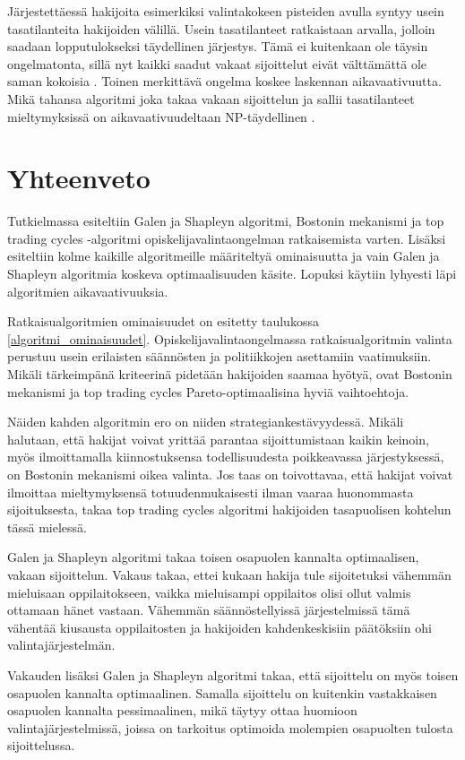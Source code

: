 \documentclass[twoside]{tktltiki}
\begin{document}
Järjestettäessä hakijoita esimerkiksi valintakokeen pisteiden avulla
syntyy usein tasatilanteita hakijoiden välillä. Usein tasatilanteet
ratkaistaan arvalla, jolloin saadaan lopputulokseksi täydellinen
järjestys. Tämä ei kuitenkaan ole täysin ongelmatonta, sillä nyt
kaikki saadut vakaat sijoittelut eivät välttämättä ole saman kokoisia
\cite{manlove02}. Toinen merkittävä ongelma koskee laskennan
aikavaativuutta. Mikä tahansa algoritmi joka takaa vakaan sijoittelun
ja sallii tasatilanteet mieltymyksissä on aikavaativuudeltaan
NP-täydellinen \cite{manlove02}.

\section{Yhteenveto}

Tutkielmassa esiteltiin Galen ja Shapleyn algoritmi, Bostonin
mekanismi ja top trading cycles -algoritmi opiskelijavalintaongelman
ratkaisemista varten. Lisäksi esiteltiin kolme kaikille algoritmeille
määriteltyä ominaisuutta ja vain Galen ja Shapleyn algoritmia koskeva
optimaalisuuden käsite. Lopuksi käytiin lyhyesti läpi algoritmien
aikavaativuuksia.

Ratkaisualgoritmien ominaisuudet on esitetty taulukossa
\ref{algoritmi_ominaisuudet}. Opiskelijavalintaongelmassa
ratkaisualgoritmin valinta perustuu usein erilaisten säännösten ja
politiikkojen asettamiin vaatimuksiin. Mikäli tärkeimpänä kriteerinä
pidetään hakijoiden saamaa hyötyä, ovat Bostonin mekanismi ja top
trading cycles Pareto-optimaalisina hyviä vaihtoehtoja.

Näiden kahden algoritmin ero on niiden strategiankestävyydessä. Mikäli
halutaan, että hakijat voivat yrittää parantaa sijoittumistaan kaikin
keinoin, myös ilmoittamalla kiinnostuksensa todellisuudesta
poikkeavassa järjestyksessä, on Bostonin mekanismi oikea valinta. Jos
taas on toivottavaa, että hakijat voivat ilmoittaa mieltymyksensä
totuudenmukaisesti ilman vaaraa huonommasta sijoituksesta, takaa top
trading cycles algoritmi hakijoiden tasapuolisen kohtelun tässä
mielessä.

Galen ja Shapleyn algoritmi takaa toisen osapuolen kannalta
optimaalisen, vakaan sijoittelun. Vakaus takaa, ettei kukaan hakija
tule sijoitetuksi vähemmän mieluisaan oppilaitokseen, vaikka
mieluisampi oppilaitos olisi ollut valmis ottamaan hänet vastaan.
Vähemmän säännöstellyissä järjestelmissä tämä vähentää kiusausta
oppilaitosten ja hakijoiden kahdenkeskisiin päätöksiin ohi
valintajärjestelmän.

Vakauden lisäksi Galen ja Shapleyn algoritmi takaa, että sijoittelu on
myös toisen osapuolen kannalta optimaalinen. Samalla sijoittelu on
kuitenkin vastakkaisen osapuolen kannalta pessimaalinen, mikä täytyy
ottaa huomioon valintajärjestelmissä, joissa on tarkoitus optimoida
molempien osapuolten tulosta sijoittelussa.
\end{document}
